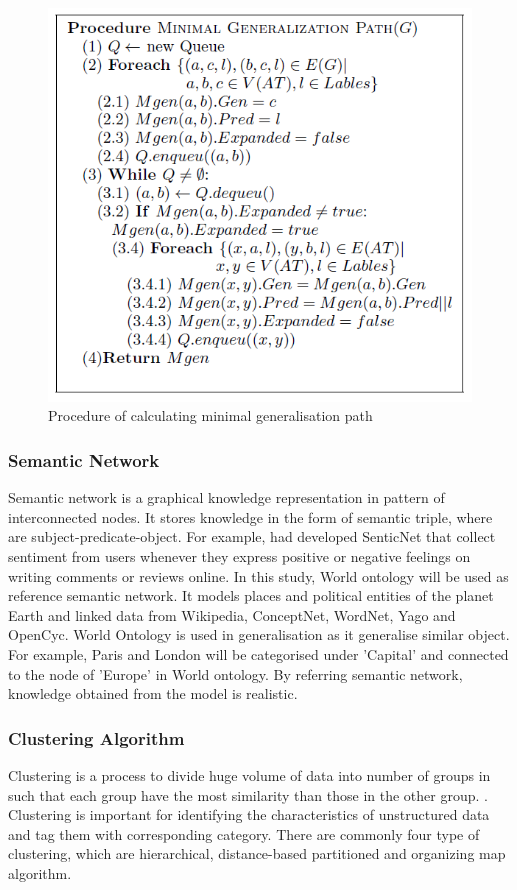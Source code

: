 \documentclass[twoside]{utmthesis}
\begin{document}
\begin{figure}[H]
	\centering
	\includegraphics[width=0.7\linewidth]{diagram/minGeneralisation}
	\caption{Procedure of calculating minimal generalisation path \citep{radinsky2012learning}}
	\label{fig:mingeneralisation}
\end{figure}
\vspace{-1.5cm}

\subsubsection{Semantic Network}
Semantic network is a graphical knowledge representation in pattern of interconnected nodes. It stores knowledge in the form of semantic triple, where are subject-predicate-object. For example, \cite{kaschesky2011opinion} had developed SenticNet that collect sentiment from users whenever they express positive or negative feelings on writing comments or reviews online. In this study, World ontology will be used as reference semantic network. It models places and political entities of the planet Earth and linked data from Wikipedia, ConceptNet, WordNet, Yago and OpenCyc. World Ontology is used in generalisation as it generalise similar object. For example, Paris and London will be categorised under 'Capital' and connected to the node of 'Europe' in World ontology. By referring semantic network, knowledge obtained from the model is realistic.  

\subsubsection{Clustering Algorithm}
Clustering is a process to divide huge volume of data into number of groups in such that each group have the most similarity than those in the other group. \citep{sauravkaushik2016}. Clustering is important for identifying the characteristics of unstructured data and tag them with corresponding category. There are commonly four type of clustering, which are hierarchical, distance-based partitioned and organizing map algorithm. \citep{suyal2014text} 
\end{document}
